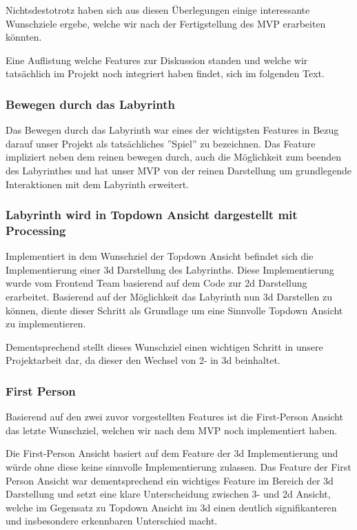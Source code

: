 	Nichtsdestotrotz haben sich aus diesen Überlegungen einige interessante Wunschziele ergebe, welche wir nach der Fertigstellung des MVP erarbeiten könnten.

	Eine Auflistung welche Features zur Diskussion standen und welche wir tatsächlich im Projekt noch integriert haben findet, sich im folgenden Text.


	\subsubsection*{Bewegen durch das Labyrinth}
		Das Bewegen durch das Labyrinth war eines der wichtigsten Features in Bezug darauf unser Projekt als tatsächliches ''Spiel'' zu bezeichnen. Das Feature impliziert neben dem reinen bewegen durch, auch die Möglichkeit zum beenden des Labyrinthes und hat unser MVP von der reinen Darstellung um grundlegende Interaktionen mit dem Labyrinth erweitert.

	\subsubsection*{Labyrinth wird in Topdown Ansicht dargestellt mit Processing}
		Implementiert in dem Wunschziel der Topdown Ansicht befindet sich die Implementierung einer 3d Darstellung des Labyrinths. Diese Implementierung wurde vom Frontend Team basierend auf dem Code zur 2d Darstellung erarbeitet. Basierend auf der Möglichkeit das Labyrinth nun 3d Darstellen zu können, diente dieser Schritt als Grundlage um eine Sinnvolle Topdown Ansicht zu implementieren.

		Dementsprechend stellt dieses Wunschziel einen wichtigen Schritt in unsere Projektarbeit dar, da dieser den Wechsel von 2- in 3d beinhaltet.

	\subsubsection*{First Person}
		Basierend auf den zwei zuvor vorgestellten Features ist die First-Person Ansicht das letzte Wunschziel, welchen wir nach dem MVP noch implementiert haben.

		Die First-Person Ansicht basiert auf dem Feature der 3d Implementierung und würde ohne diese keine sinnvolle Implementierung zulassen. Das Feature der First Person Ansicht war dementsprechend ein wichtiges Feature im Bereich der 3d Darstellung und setzt eine klare Unterscheidung zwischen 3- und 2d Ansicht, welche im Gegensatz zu Topdown Ansicht im 3d einen deutlich signifikanteren und insbesondere erkennbaren Unterschied macht.

